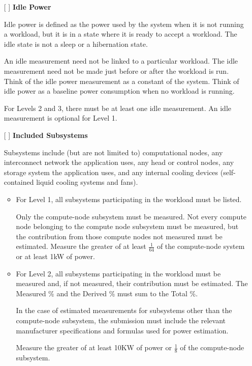 \begin{itemize}
\item[{[ ]}]
\textbf{Idle Power}

Idle power is defined as the power used by the system when it is not running a workload, but it is in a state where it is ready to accept a workload. The idle state is not a sleep or a hibernation state.

An idle measurement need not be linked to a particular workload. The idle measurement need not be made just before or after the workload is run. Think of the idle power measurement as a constant of the system. Think of idle power as a baseline power consumption when no workload is running. 

For Levels 2 and 3, there must be at least one idle measurement. An idle measurement is optional for Level 1. 

\newpage
\item[{[ ]}]
\textbf{Included Subsystems}

Subsystems include (but are not limited to) computational nodes, any interconnect network the application uses, any head or control nodes, any storage system the application uses, and any internal cooling devices (self-contained liquid cooling systems and fans).  

\begin{itemize}
\item
For Level 1, all subsystems participating in the workload must be listed. 

Only the compute-node subsystem must be measured. Not every compute node belonging to the compute node subsystem must be measured, but the contribution from those compute nodes not measured must be estimated.  Measure the greater of at 
least $ \frac{1}{64} $ of the compute-node system or at least 1kW of power. 

\item
For Level 2, all subsystems participating in the workload must be measured and, if not measured, their contribution must be estimated. The Measured \% and the Derived \% must sum to the Total \%.

In the case of estimated measurements for subsystems other than 
the compute-node subsystem, the submission must include the relevant 
manufacturer specifications and formulas used for power estimation. 

Measure the greater of at least 10KW of power or $ \frac{1}{8} $ of the compute-node subsystem.


\end{itemize}
\end{itemize}
